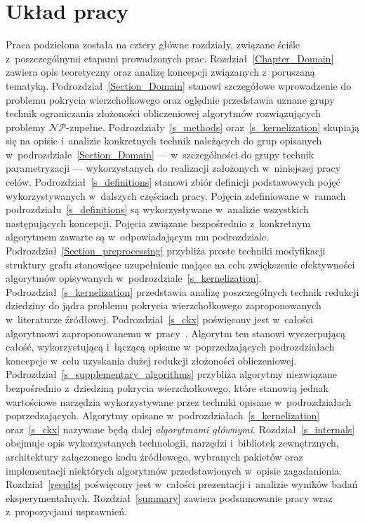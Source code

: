 \section{Układ pracy}\label{Section_Layout}
\par{
  Praca podzielona została na cztery główne rozdziały, związane ściśle z~poszczególnymi etapami prowadzonych prac.
  Rozdział~\ref{Chapter_Domain} zawiera opis teoretyczny oraz analizę koncepcji związanych z~poruszaną tematyką.
  Podrozdział~\ref{Section_Domain} stanowi szczegółowe wprowadzenie do problemu pokrycia wierzchołkowego oraz oględnie przedstawia uznane grupy technik ograniczania złożoności obliczeniowej algorytmów rozwiązujących problemy $\mathcal{NP}$-zupełne.
  Podrozdziały~\ref{s_methods} oraz~\ref{s_kernelization} skupiają się na opisie i~analizie konkretnych technik należących do grup opisanych w~podrozdziale~\ref{Section_Domain} --- w~szczególności do grupy technik parametryzacji --- wykorzystanych do realizacji założonych w~niniejszej pracy celów.
  Podrozdział~\ref{s_definitions} stanowi zbiór definicji podstawowych pojęć wykorzystywanych w~dalszych częściach pracy.
  Pojęcia zdefiniowane w~ramach podrozdziału~\ref{s_definitions} są wykorzystywane w~analizie wszystkich następujących koncepcji.
  Pojęcia związane bezpośrednio z~konkretnym algorytmem zawarte są w~odpowiadającym mu podrozdziale.
  Podrozdział~\ref{Section_preprocessing} przybliża proste techniki modyfikacji struktury grafu stanowiące uzupełnienie mające na celu zwiększenie efektywności algorytmów opisywanych w~podrozdziale~\ref{s_kernelization}.
  Podrozdział~\ref{s_kernelization} przedstawia analizę poszczególnych technik redukcji dziedziny do jądra problemu pokrycia wierzchołkowego zaproponowanych w~literaturze źródłowej.
  Podrozdział~\ref{s_ckx} poświęcony jest w~całości algorytmowi zaproponowanemu w~pracy~\cite{ImprovedBounds10}.
  Algorytm ten stanowi wyczerpującą całość, wykorzystującą i~łączącą opisane w~poprzedzających podrozdziałach koncepcje w~celu uzyskania dużej redukcji złożoności obliczeniowej.
  Podrozdział~\ref{s_supplementary_algorithms} przybliża algorytmy niezwiązane bezpośrednio z~dziedziną pokrycia wierzchołkowego, które stanowią jednak wartościowe narzędzia wykorzystywane przez techniki opisane w~podrozdziałach poprzedzających.
  Algorytmy opisane w~podrozdziałach~\ref{s_kernelization} oraz~\ref{s_ckx} nazywane będą dalej \emph{algorytmami głównymi}.
  Rozdział~\ref{s_internals} obejmuje opis wykorzystanych technologii, narzędzi i~bibliotek zewnętrznych, architektury załączonego kodu źródłowego, wybranych pakietów oraz implementacji niektórych algorytmów przedstawionych w~opisie zagadanienia.
  Rozdział~\ref{results} poświęcony jest w~całości prezentacji i~analizie wyników badań eksperymentalnych.
  Rozdział~\ref{summary} zawiera podsumowanie pracy wraz z~propozycjami usprawnień.
}
